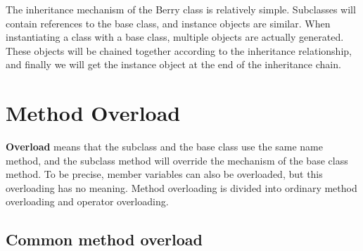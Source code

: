 The inheritance mechanism of the Berry class is relatively simple. Subclasses will contain references to the base class, and instance objects are similar. When instantiating a class with a base class, multiple objects are actually generated. These objects will be chained together according to the inheritance relationship, and finally we will get the instance object at the end of the inheritance chain.

\section {Method Overload}

\textbf{Overload} means that the subclass and the base class use the same name method, and the subclass method will override the mechanism of the base class method. To be precise, member variables can also be overloaded, but this overloading has no meaning. Method overloading is divided into ordinary method overloading and operator overloading.

\subsection {Common method overload}

